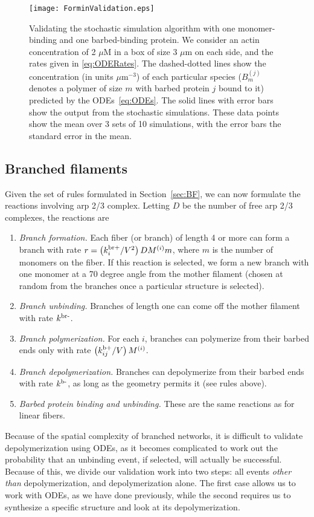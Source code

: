 \documentclass[11pt]{article}
\renewcommand{\i}[1]{{#1}^{(i)}}
\renewcommand{\j}[1]{{#1}^{(j)}}
\begin{document}
\begin{appendices}
\begin{figure}
\centering
\texttt{[image: ForminValidation.eps]}
\caption{\label{fig:ForminValid}Validating the stochastic simulation algorithm with one monomer-binding and one barbed-binding protein. We consider an actin concentration of 2 $\mu$M in a box of size 3 $\mu$m on each side, and the rates given in \eqref{eq:ODERates}. The dashed-dotted lines show the concentration (in units $\mu$m$^{-3}$) of each particular species ($\j B_m$ denotes a polymer of size $m$ with barbed protein $j$ bound to it) predicted by the ODEs\ \eqref{eq:ODEs}. The solid lines with error bars show the output from the stochastic simulations. These data points show the mean over 3 sets of 10 simulations, with the error bars the standard error in the mean.   }
\end{figure}

\subsection{Branched filaments}
Given the set of rules formulated in Section\ \ref{sec:BF}, we can now formulate the reactions involving arp 2/3 complex. Letting $D$ be the number of free arp 2/3 complexes, the reactions are
\begin{enumerate}
\item \emph{Branch formation.} Each fiber (or branch) of length 4 or more can form a branch with rate $r=\left(\kbrp_i/V^2\right) D \i M m$, where $m$ is the number of monomers on the fiber. If this reaction is selected, we form a new branch with one monomer at a 70 degree angle from the mother filament (chosen at random from the branches once a particular structure is selected).
\item \emph{Branch unbinding.} Branches of length one can come off the mother filament with rate $k^\text{br-}$.
\item \emph{Branch polymerization.} For each $i$, branches can polymerize from their barbed ends only with rate $\left(\kbp_{ij}/V\right) \i M$. 
\item \emph{Branch depolymerization.} Branches can depolymerize from their barbed ends with rate $k^\text{b-}$, as long as the geometry permits it (see rules above).
\item \emph{Barbed protein binding and unbinding.} These are the same reactions as for linear fibers. 
\end{enumerate}

Because of the spatial complexity of branched networks, it is difficult to validate depolymerization using ODEs, as it becomes complicated to work out the probability that an unbinding event, if selected, will actually be successful. Because of this, we divide our validation work into two steps: all events \emph{other than} depolymerization, and depolymerization alone. The first case allows us to work with ODEs, as we have done previously, while the second requires us to synthesize a specific structure and look at its depolymerization. 


\end{appendices}
\end{document}
